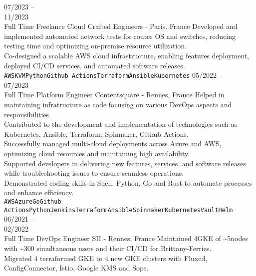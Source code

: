 \documentclass[10pt]{developercv} %
\begin{document}
\begin{entrylist}
	\entry
		{07/2023 --\\11/2023\\\footnotesize{Full Time}}
		{Freelance}
		{Cloud Crafted Engineers - Paris, France}
		{Developed and implemented automated network tests for router OS and switches, reducing testing time and optimizing on-premise resource utilization.\\
		Co-designed a scalable AWS cloud infrastructure, enabling features deployment, deployed CI/CD services, and automated software releases.\\
		\texttt{AWS}\slashsep\texttt{KVM}\slashsep\texttt{Python}\slashsep\texttt{Github Actions}\slashsep\texttt{Terraform}\slashsep\texttt{Ansible}\slashsep\texttt{Kubernetes}}
	\entry
		{05/2022 --\\07/2023\\\footnotesize{Full Time}}
		{Platform Engineer}
		{Contentsquare - Rennes, France}
		{Helped in maintaining infratructure as code focusing on various DevOps aspects and responsibilities.\\
		Contributed to the development and implementation of technologies such as Kubernetes, Ansible, Terraform, Spinnaker, Github Actions.\\
		Successfully managed multi-cloud deployments across Azure and AWS, optimizing cloud resources and maintaining high availability.\\
		Supported developers in delivering new features, services, and software releases while troubleshooting issues to ensure seamless operations.\\
		Demonstrated coding skills in Shell, Python, Go and Rust to automate processes and enhance efficiency.\\
		\texttt{AWS}\slashsep\texttt{Azure}\slashsep\texttt{Go}\slashsep\texttt{Github Actions}\slashsep\texttt{Python}\slashsep\texttt{Jenkins}\slashsep\texttt{Terraform}\slashsep\texttt{Ansible}\slashsep\texttt{Spinnaker}\slashsep\texttt{Kubernetes}\slashsep\texttt{Vault}\slashsep\texttt{Helm}}
	\entry
		{06/2021 --\\02/2022\\\footnotesize{Full Time}}
		{DevOps Engineer}
		{SII - Rennes, France}
		{Maintained 4GKE of \textasciitilde5nodes with \textasciitilde300 simultaneous users and their CI/CD for Brittany-Ferries.\\
Migrated 4 terraformed GKE to 4 new GKE clusters with Fluxcd, ConfigConnector, Istio, Google KMS and Sops.\\
}
\end{entrylist}
\end{document}
